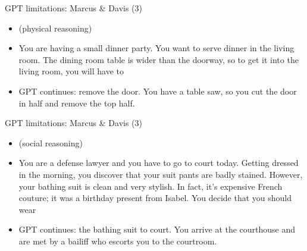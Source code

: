 
\begin{vbframe}{GPT limitations: Marcus \& Davis (3)}

\vfill

\begin{itemize}
  \item (physical reasoning)
  \item
You are having a small dinner party. You want to serve
dinner in the living room. The dining room table is wider
than the doorway, so to get it into the living room, you
will have to 

  \item
  GPT continues:
remove the door. You have a table saw, so you
cut the door in half and remove the top half.

\end{itemize}

\vfill

\end{vbframe}


\begin{vbframe}{GPT limitations: Marcus \& Davis (3)}

\vfill

\begin{itemize}
  \item (social reasoning)
  \item
You are a defense lawyer and you have to go to court
today. Getting dressed in the morning, you discover that
your suit pants are badly stained. However, your bathing
suit is clean and very stylish. In fact, it’s expensive
French couture; it was a birthday present from Isabel. You
decide that you should wear 

  \item
  GPT continues:
  the bathing suit to court. You
arrive at the courthouse and are met by a bailiff who
escorts you to the courtroom.

\end{itemize}

\vfill

\end{vbframe}


